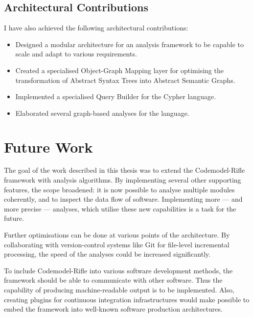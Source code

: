 \subsection{Architectural Contributions}

I have also achieved the following architectural contributions:

\begin{itemize}
\item Designed a modular architecture for an analysis framework to be capable to scale and adapt to various requirements.
\item Created a specialised Object-Graph Mapping layer for optimising the transformation of Abstract Syntax Trees into Abstract Semantic Graphs.
\item Implemented a specialised Query Builder for the Cypher language.
\item Elaborated several graph-based analyses for the \es language.
\end{itemize}


\section{Future Work}

The goal of the work described in this thesis was to extend the Codemodel-Rifle framework with analysis algorithms. By implementing several other supporting features, the scope broadened: it is now possible to analyse multiple modules coherently, and to inspect the data flow of \es software. Implementing more — and more precise — analyses, which utilise these new capabilities is a task for the future.

Further optimisations can be done at various points of the architecture. By collaborating with version-control systems like Git for file-level incremental processing, the speed of the analyses could be increased significantly.

To include Codemodel-Rifle into various software development methods, the framework should be able to communicate with other software. Thus the capability of producing machine-readable output is to be implemented. Also, creating plugins for continuous integration infrastructures would make possible to embed the framework into well-known software production architectures.